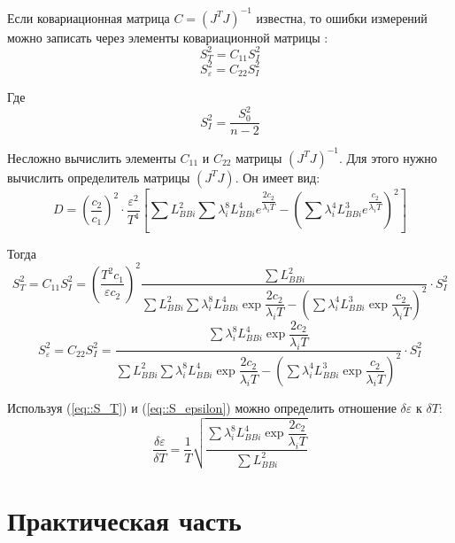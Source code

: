 Если ковариационная матрица $C=(J^T J)^{-1}$ известна, то ошибки измерений можно записать через элементы ковариационной матрицы \cite{12}:
\begin{equation}
    S_T^2 = C_{11} S_I^2
\end{equation}
\begin{equation}
    S_{\varepsilon}^2 = C_{22} S_I^2
\end{equation}

Где
\begin{equation}
    S_I^2 = \dfrac{S_0^2}{n - 2}
\end{equation}

Несложно вычислить элементы $C_{11}$ и $C_{22}$ матрицы $(J^T J)^{-1}$. Для этого нужно вычислить определитель матрицы $(J^T J)$. Он имеет вид:
\begin{equation}
    D = (\dfrac{c_2}{c_1})^2 \cdot \dfrac{\varepsilon^2}{T^4} [\sum L_{BBi}^2 \sum \lambda_i^8 L_{BBi}^4 e^{\dfrac{2 c_2}{\lambda_i T}} - (\sum \lambda_i^4 L_{BBi}^3 e^{\dfrac{c_2}{\lambda_i T}})^2]
\end{equation}

Тогда
\begin{equation}
\label{eq::S_T}
    S_T^2 = C_{11} S_I^2 = (\dfrac{T^2 c_1}{\varepsilon c_2})^2 \dfrac{\sum L_{BBi}^2}{\sum L_{BBi}^2 \sum \lambda_i^8 L_{BBi}^4 \exp{\dfrac{2 c_2}{\lambda_i T}} - (\sum \lambda_i^4 L_{BBi}^3 \exp{\dfrac{c_2}{\lambda_i T}})^2} \cdot S_I^2
\end{equation}
\begin{equation}
\label{eq::S_epsilon}
    S_{\varepsilon}^2 = C_{22} S_I^2 = \dfrac{\sum \lambda_i^8 L_{BBi}^4 \exp{\dfrac{2 c_2}{\lambda_i T}}}{\sum L_{BBi}^2 \sum \lambda_i^8 L_{BBi}^4 \exp{\dfrac{2 c_2}{\lambda_i T}} - (\sum \lambda_i^4 L_{BBi}^3 \exp{\dfrac{c_2}{\lambda_i T}})^2} \cdot S_I^2
\end{equation}

Используя (\ref{eq::S_T}) и (\ref{eq::S_epsilon}) можно определить отношение $\delta \varepsilon$ к $\delta T$:
\begin{equation}
    \dfrac{\delta \varepsilon}{\delta T} = \dfrac{1}{T} \sqrt{\dfrac{\sum \lambda_i^8 L_{BBi}^4 \exp{\dfrac{2 c_2}{\lambda_i T}}}{\sum L_{BBi}^2}}
\end{equation}

\section{Практическая часть}


